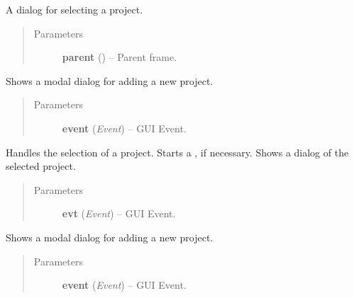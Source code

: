 \documentclass[letterpaper,10pt,english]{sphinxmanual}
\begin{document}
\begin{fulllineitems}
\label{api:wos.ProjectSelectDialog}
A dialog for selecting a project.
\begin{quote}\begin{description}
\item[{Parameters}] \leavevmode
\textbf{parent} () -- Parent frame.

\end{description}\end{quote}

\begin{fulllineitems}
\label{api:wos.ProjectSelectDialog.AddEvent}
Shows a modal dialog for adding a new project.
\begin{quote}\begin{description}
\item[{Parameters}] \leavevmode
\textbf{event} (\emph{Event}) -- GUI Event.

\end{description}\end{quote}

\end{fulllineitems}


\begin{fulllineitems}
\label{api:wos.ProjectSelectDialog.DelEvent}
Handles the selection of a project.
Starts a {\hyperref[api:wos.CURRENT_PROJECT]{}}, if necessary.
Shows a dialog of the selected project.
\begin{quote}\begin{description}
\item[{Parameters}] \leavevmode
\textbf{evt} (\emph{Event}) -- GUI Event.

\end{description}\end{quote}

\end{fulllineitems}


\begin{fulllineitems}
\label{api:wos.ProjectSelectDialog.EditEvent}
Shows a modal dialog for adding a new project.
\begin{quote}\begin{description}
\item[{Parameters}] \leavevmode
\textbf{event} (\emph{Event}) -- GUI Event.


\end{description}
\end{quote}
\end{fulllineitems}
\end{fulllineitems}
\end{document}
